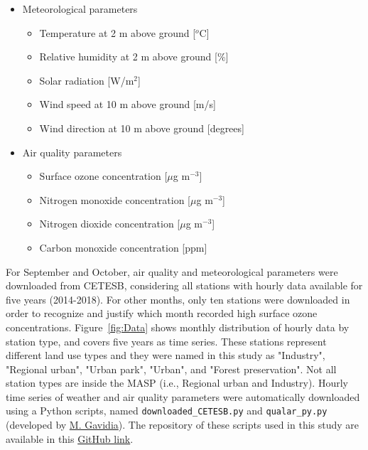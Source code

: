 \begin{itemize}
	\item Meteorological parameters
		\begin{itemize}
			\item Temperature at 2 m above ground [$^o$C]
			\item Relative humidity at 2 m above ground [\%]
			\item Solar radiation [W/m$^2$]
			\item Wind speed at 10 m above ground [m/s]
			\item Wind direction at 10 m above ground [degrees]
		\end{itemize}
		
	\item Air quality parameters
		\begin{itemize}
			\item Surface ozone concentration [$\mu$g m$^{-3}$]
			\item Nitrogen monoxide concentration [$\mu$g m$^{-3}$]
			\item Nitrogen dioxide concentration [$\mu$g m$^{-3}$]
			\item Carbon monoxide concentration [ppm] 
		\end{itemize}
\end{itemize}

For September and October, air quality and meteorological parameters were downloaded from CETESB, considering all stations with hourly data available for five years (2014-2018).
For other months, only ten stations were downloaded in order to recognize and justify which month recorded high surface ozone concentrations.
Figure~\ref{fig:Data} shows monthly distribution of hourly data by station type, and covers five years as time series.
These stations represent different land use types and they were named in this study as "Industry", "Regional urban", "Urban park", "Urban", and "Forest preservation".
Not all station types are inside the MASP (i.e., Regional urban and Industry). 
 Hourly time series of weather and air quality parameters were automatically downloaded using a Python scripts, named \verb|downloaded_CETESB.py| and \verb|qualar_py.py| (developed by \href{https://github.com/quishqa/qualR.py}{M. Gavidia}).
The repository of these scripts used in this study are available in this \href{https://github.com/adelgadop/Master_dissertation/tree/main/02_Obs_scripts}{GitHub link}.

